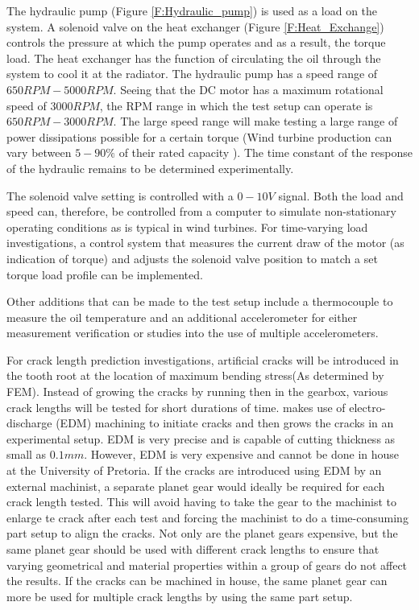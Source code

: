 The hydraulic pump (Figure \ref{F:Hydraulic_pump}) is used as a load on the system. A solenoid valve on the heat exchanger (Figure \ref{F:Heat_Exchange}) controls the pressure at which the pump operates and as a result, the torque load. The heat exchanger has the function of circulating the oil through the system to cool it at the radiator. The hydraulic pump has a speed range of $650RPM - 5000RPM$. Seeing that the DC motor has a maximum rotational speed of $3000 RPM$, the RPM range in which the test setup can operate is $650 RPM - 3000 RPM$. The large speed range will make testing a large range of power dissipations possible for a certain torque (Wind turbine production can vary between $5-90\%$ of their rated capacity \citep{Zimroz2014}). The time constant of the response of the hydraulic remains to be determined experimentally.

The solenoid valve setting is controlled with a $0-10V$ signal. Both the load and speed can, therefore, be controlled from a computer to simulate non-stationary operating conditions as is typical in wind turbines. For time-varying load investigations, a control system that measures the current draw of the motor (as indication of torque) and adjusts the solenoid valve position to match a set torque load profile can be implemented.

Other additions that can be made to the test setup include a thermocouple to measure the oil temperature and an additional accelerometer for either measurement verification or studies into the use of multiple accelerometers.


For crack length prediction investigations, artificial cracks will be introduced in the tooth root at the location of maximum bending stress(As determined by FEM). Instead of growing the cracks by running then in the gearbox, various crack lengths will be tested for short durations of time.
\cite{Ballarini1997} makes use of electro-discharge (EDM) machining to initiate cracks and then grows the cracks in an experimental setup. EDM is very precise and is capable of cutting thickness as small as $0.1mm$. However, EDM is very expensive and cannot be done in house at the University of Pretoria. If the cracks are introduced using EDM by an external machinist, a separate planet gear would ideally be required for each crack length tested. This will avoid having to take the gear to the machinist to enlarge te crack after each test and forcing the machinist to do a time-consuming part setup to align the cracks. Not only are the planet gears expensive, but the same planet gear should be used with different crack lengths to ensure that varying geometrical and material properties within a group of gears do not affect the results. If the cracks can be machined in house, the same planet gear can more be used for multiple crack lengths by using the same part setup. 

